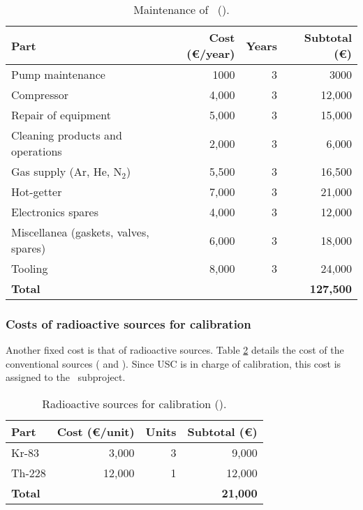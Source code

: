 \begin{table}[h!]
\begin{center}
\begin{tabular}{|l|r|r|r|}
\hline
Part & 	Cost (\euro/year)	& Years	& Subtotal (\euro) \\
\hline
Pump maintenance	& 1000	& 3	& 3000\\
Compressor              & 4,000 &	3	& 12,000 \\ 
Repair of equipment	& 5,000 &	3	&15,000 \\
Cleaning products and operations	& 2,000 &	3 & 6,000 \\
Gas supply (Ar, He, N$_2$)  & 5,500 & 	3 &	16,500 \\
Hot-getter & 7,000 & 3 & 21,000\\
Electronics spares & 4,000   & 3 & 12,000\\
Miscellanea (gaskets, valves, spares)	& 6,000 &	3 & 18,000 \\
Tooling	& 8,000 & 3 & 24,000 \\
\hline
{\bf Total} & & & {\bf 127,500}\\
\hline
\end{tabular}  
\caption{Maintenance of \Next\ (\sIFIC).}
\label{tab.main}
\end{center}
\end{table} 


\subsubsection{Costs of radioactive sources for calibration}

Another fixed cost is that of radioactive sources. Table \ref{tab.calib} details the cost of the conventional sources ( and ). Since USC is in charge of calibration, this cost is assigned to the \sUSC\ subproject.

\begin{table}[h!]
\begin{center}
\begin{tabular}{|l|r|r|r|}
\hline
Part & Cost (\euro/unit) & Units & Subtotal (\euro) \\
\hline  
Kr-83 &	3,000 &	3 & 9,000 \\
Th-228 &	12,000 & 1 & 12,000 \\
\hline
{\bf Total }   &  & &  {\bf 21,000} \\
\hline
\end{tabular}  
\caption{Radioactive sources for calibration (\sUSC).}
\label{tab.calib}
\end{center}
\end{table}

